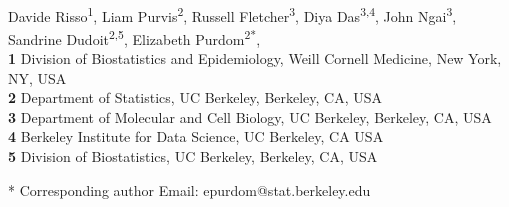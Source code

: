 \documentclass[10pt,letterpaper]{article}
\date{}
\begin{document}
\vspace*{0.2in}
\begin{flushleft}
{\Large 
\textbf{}}
\newline
\\
Davide Risso\textsuperscript{1},
Liam Purvis\textsuperscript{2},
Russell Fletcher\textsuperscript{3},
Diya Das\textsuperscript{3,4},
John Ngai\textsuperscript{3},
Sandrine Dudoit\textsuperscript{2,5}, 
Elizabeth Purdom\textsuperscript{2*},
\\
\bigskip
\textbf{1} Division of Biostatistics and Epidemiology, Weill Cornell Medicine, New York, NY, USA
\\
\textbf{2} Department of Statistics, UC Berkeley, Berkeley, CA, USA
\\
\textbf{3} Department of Molecular and Cell Biology, UC Berkeley, Berkeley, CA, USA
\\
\textbf{4} Berkeley Institute for Data Science, UC Berkeley, CA USA
\\
\textbf{5} Division of Biostatistics, UC Berkeley, Berkeley, CA, USA
\\
\bigskip

* Corresponding author
Email: epurdom@stat.berkeley.edu

\end{flushleft}
\end{document}
